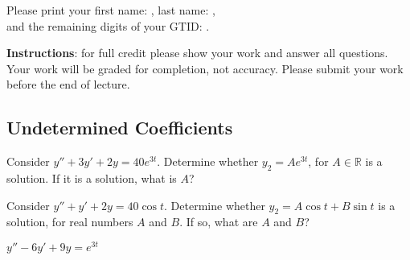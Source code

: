 \documentclass[12pt]{exam}
\begin{document}
    
\vspace*{-1cm}

\begin{center}
{\Large \TestName}
\end{center}
\newcommand{\ID}{Please print your first name: \framebox{\strut\hspace{4.2cm}}, last name: \framebox{\strut\hspace{4.2cm}}, \\[2pt] and the remaining digits of your GTID:  \framebox{\strut $9$}\framebox{\strut $0$}\framebox{\strut\hspace{0.19cm}}\framebox{\strut\hspace{0.19cm}}\framebox{\strut\hspace{0.19cm}}\framebox{\strut\hspace{0.19cm}}\framebox{\strut\hspace{0.19cm}}\framebox{\strut\hspace{0.19cm}}\framebox{\strut\hspace{0.19cm}}.}

\ID

\vspace{6pt}
{\small \textbf{Instructions}: for full credit please show your work and answer all questions. Your work will be graded for completion, not accuracy. Please submit your work before the end of lecture. }
\subsection*{Undetermined Coefficients}
\begin{questions}

\question[1] Consider $\displaystyle y'' +3y' +2y = 40e^{3t}$. Determine whether $y_2 = Ae^{3t}$, for $A\in \mathbb R$ is a solution. If it is a solution, what is $A$? \vfill


\question[1] Consider $\displaystyle y'' +y'+ 2y = 40\cos t$. Determine whether $y_2 = A\cos t + B\sin t$ is a solution, for real numbers $A$ and $B$. If so, what are $A$ and $B$? \vfill

\newpage  
       \question[2]{} $\displaystyle y'' -6y' + 9y = e^{3t}$
\end{questions}
\end{document}
